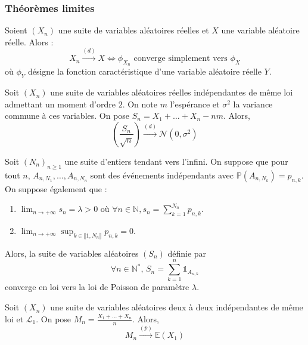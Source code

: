   \subsubsection{Théorèmes limites}


  \begin{theorem}[Lévy]
    Soient $(X_n)$ une suite de variables aléatoires réelles et $X$ une variable aléatoire réelle. Alors :
    \[ X_n \overset{(d)}{\longrightarrow} X \iff \phi_{X_n} \text{ converge simplement vers } \phi_X \]
    où $\phi_Y$ désigne la fonction caractéristique d'une variable aléatoire réelle $Y$.
  \end{theorem}


  \begin{theorem}
    Soit $(X_n)$ une suite de variables aléatoires réelles indépendantes de même loi admettant un moment d'ordre $2$. On note $m$ l'espérance et $\sigma^2$ la variance commune à ces variables. On pose $S_n = X_1 + \dots + X_n - nm$. Alors,
    \[ \left ( \frac{S_n}{\sqrt{n}} \right) \overset{(d)}{\longrightarrow} \mathcal{N}(0, \sigma^2) \]
  \end{theorem}


  \begin{application}
    Soit $(N_n)_{n \geq 1}$ une suite d'entiers tendant vers l'infini. On suppose que pour tout $n$, $A_{n,N_1}, \dots , A_{n,N_n}$ sont des événements indépendants avec $\mathbb{P}(A_{n,N_k}) = p_{n,k}$. On suppose également que :
    \begin{enumerate}[label=(\roman*)]
      \item $\lim_{n \rightarrow +\infty} s_n = \lambda > 0$ où $\forall n \in \mathbb{N}, s_n = \sum_{k=1}^{N_n} p_{n,k}$.
      \item $\lim_{n \rightarrow +\infty} \sup_{k \in \llbracket 1, N_n \rrbracket} p_{n,k} = 0$.
    \end{enumerate}
    Alors, la suite de variables aléatoires $(S_n)$ définie par
    \[ \forall n \in \mathbb{N}^*, \, S_n = \sum_{k=1}^n \mathbb{1}_{A_{n,k}} \]
    converge en loi vers la loi de Poisson de paramètre $\lambda$.
  \end{application}


  \begin{theorem}
    Soit $(X_n)$ une suite de variables aléatoires deux à deux indépendantes de même loi et $\mathcal{L}_1$. On pose $M_n = \frac{X_1 + \dots + X_n}{n}$. Alors,
    \[ M_n \overset{(p)}{\longrightarrow} \mathbb{E}(X_1) \]
  \end{theorem}

